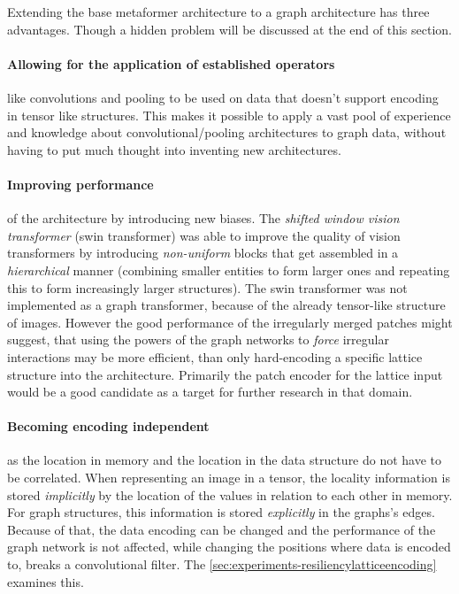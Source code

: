 Extending the base metaformer architecture to a graph architecture has three advantages. 
Though a hidden problem will be discussed at the end of this section.

\paragraph{Allowing for the application of established operators} like convolutions and pooling to be used on data that doesn't support encoding in tensor like structures. 
This makes it possible to apply a vast pool of experience and knowledge about convolutional/pooling architectures to graph data, without having to put much thought into inventing new architectures.

\paragraph{Improving performance} of the architecture by introducing new biases.
The \emph{shifted window vision transformer} (swin transformer) \cite{swinTransformerPaper} was able to improve the quality of vision transformers by introducing \emph{non-uniform} blocks that get assembled in a \emph{hierarchical} manner (combining smaller entities to form larger ones and repeating this to form increasingly larger structures).
The swin transformer was not implemented as a graph transformer, because of the already tensor-like structure of images. 
However the good performance of the irregularly merged patches might suggest, that using the powers of the graph networks to \emph{force} irregular interactions may be more efficient, than only hard-encoding a specific lattice structure into the architecture.
Primarily the patch encoder for the lattice input would be a good candidate as a target for further research in that domain.

\paragraph{Becoming encoding independent} as the location in memory and the location in the data structure do not have to be correlated. 
When representing an image in a tensor, the locality information is stored \emph{implicitly} by the location of the values in relation to each other in memory. 
For graph structures, this information is stored \emph{explicitly} in the graphs's edges.
Because of that, the data encoding can be changed and the performance of the graph network is not affected, while changing the positions where data is encoded to, breaks a convolutional filter.
The \autoref{sec:experiments-resiliencylatticeencoding} examines this.\\


